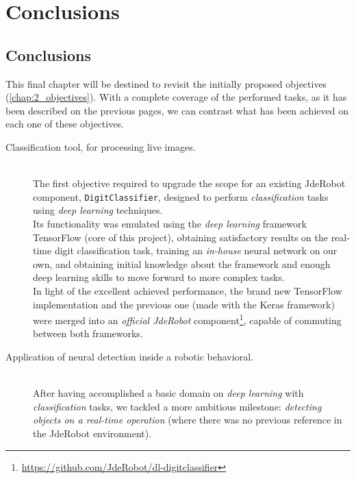 \chapter{Conclusions}
\section{Conclusions}
	This final chapter will be destined to revisit the initially proposed objectives (\autoref{chap:2_objectives}). With a complete coverage of the performed tasks, as it has been described on the previous pages, we can contrast what has been achieved on each one of these objectives.\\
	
	\begin{description}
		\item[Classification tool, for processing live images.] \hfill
			\vspace{0.2in} \\
			The first objective required to upgrade the scope for an existing JdeRobot component, \texttt{DigitClassifier}, designed to perform \emph{classification} tasks using \emph{deep learning} techniques.\\
			
			Its functionality was emulated using the \emph{deep learning} framework TensorFlow (core of this project), obtaining satisfactory results on the real-time digit classification task, training an \emph{in-house} neural network on our own, and obtaining initial knowledge about the framework and enough deep learning skills to move forward to more complex tasks.\\
			
			In light of the excellent achieved performance, the brand new TensorFlow implementation and the previous one (made with the Keras framework) were merged into an \emph{official JdeRobot} component\footnote{\url{https://github.com/JdeRobot/dl-digitclassifier}}, capable of commuting between both frameworks.
		
		\item[Application of neural detection inside a robotic behavioral.] \hfill
			\vspace{0.2in} \\		
			After having accomplished a basic domain on \emph{deep learning} with \emph{classification} tasks, we tackled a more ambitious milestone: \emph{detecting objects on a real-time operation} (where there was no previous reference in the JdeRobot environment).\\
			

\end{description}
